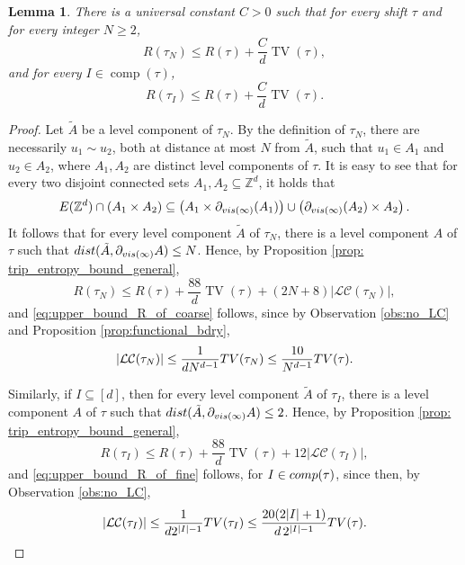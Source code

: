 \documentclass[11pt, reqno]{amsart}
\newtheorem{lemma}[theorem]{Lemma}
\DeclareMathOperator{\TV}{TV}
\DeclareMathOperator{\comp}{comp}
\numberwithin{equation}{section}
\begin{document}
\begin{lemma}
There is a universal constant $C>0$ such that for every shift $\tau$ and for every integer $N\geq 2$,
\begin{equation}\label{eq:upper_bound_R_of_coarse}
R(\tau_{N}) \leq R(\tau)+ \frac{C}{d}    \TV(\tau), 
\end{equation}
and for every $I\in \comp(\tau)$,
\begin{equation}\label{eq:upper_bound_R_of_fine}
R(\tau_I) \leq R(\tau) +\frac{C}{d} \TV(\tau).
\end{equation}
\end{lemma}

\begin{proof}
Let $\tilde{A}$ be a level component of $\tau_{N}$. By the definition of $\tau_{N}$, there are necessarily $u_1\sim u_2$, both at distance at most $N$ from $\tilde{A}$, such that $u_1\in A_1$ and $u_2\in A_2$, where $A_1,A_2$ are distinct level components of $\tau$. 
It is easy to see that for every two disjoint connected sets $A_1, A_2\subseteq {\mathbb Z}^d$, it holds that
\begin{equation}\label{eq:1_of_2_in_viz}
E({\mathbb Z}^d)\cap(A_1\times A_2)\subseteq\left(A_1\times \partial_{{\rm vis}(\infty)}(A_1)\right)\cup\left(\partial_{{\rm vis}(\infty)}(A_2)\times A_2\right).
\end{equation}
It follows that for every level component $\tilde{A}$ of $\tau_{N}$, there is a level component $A$ of $\tau$ such that ${\rm dist}(\tilde{A},\partial_{{\rm vis}(\infty)}A)\leq N$.
Hence, by Proposition \ref{prop: trip_entropy_bound_general},
\begin{equation*}
R(\tau_N) \leq R(\tau) + \frac{88}{d} \TV(\tau)+(2N+8)\lvert\mathcal{LC}(\tau_N)\rvert,
\end{equation*}
and \eqref{eq:upper_bound_R_of_coarse} follows, since by Observation \ref{obs:no_LC} and Proposition \ref{prop:functional_bdry}, 
\begin{equation*}
\lvert\mathcal{LC}(\tau_{N})\rvert\leq \frac{1}{d N^{d-1} }{\rm TV}(\tau_{N})\leq\frac{10}{N^{d-1}}{\rm TV}(\tau).
\end{equation*}

Similarly, if $I\subseteq[d]$, then for every level component $\tilde{A}$ of $\tau_I$, there is a level component $A$ of $\tau$ 
such that ${\rm dist}(\tilde{A},\partial_{{\rm vis}(\infty)}A)\leq 2$.
Hence, by Proposition \ref{prop: trip_entropy_bound_general},
\begin{equation*}
R(\tau_I) \leq R(\tau) + \frac{88}{d} \TV(\tau)+12\lvert\mathcal{LC}(\tau_I)\rvert,
\end{equation*}
and \eqref{eq:upper_bound_R_of_fine} follows, for $I\in{\rm comp}(\tau)$, since then, by Observation \ref{obs:no_LC},
\begin{equation*}
\lvert\mathcal{LC}(\tau_{I})\rvert\leq \frac{1}{d 2^{\lvert I\rvert-1} }{\rm TV}(\tau_I)\leq\frac{20(2\lvert I\rvert+1)}{d\,2^{\lvert I\rvert-1}}{\rm TV}(\tau).
\qedhere
\end{equation*}
\end{proof}
\end{document}
